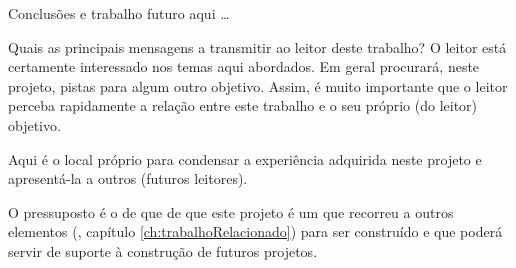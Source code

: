 Conclusões e trabalho futuro aqui \ldots

Quais as principais mensagens a transmitir ao leitor deste trabalho? O leitor está certamente interessado nos temas aqui abordados. Em geral procurará, neste projeto, pistas para algum outro objetivo. Assim, é muito importante que o leitor perceba rapidamente a relação entre este trabalho e o seu próprio (do leitor) objetivo.

Aqui é o local próprio para condensar a experiência adquirida neste projeto e apresentá-la a outros (futuros leitores).

O pressuposto é o de que de que este projeto é um  que recorreu a outros elementos (\cf, capítulo \ref{ch:trabalhoRelacionado}) para ser construído e que poderá servir de suporte à construção de futuros projetos.








